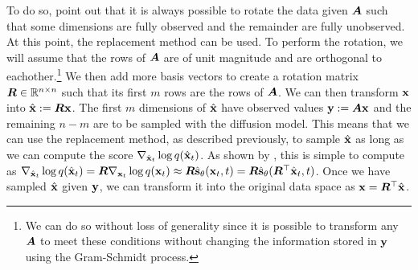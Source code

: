 To do so, \citet{song2020score} point out that it is always possible to rotate the data given ${\bm{A}}$ such that some dimensions are fully observed and the remainder are fully unobserved. At this point, the replacement method can be used. To perform the rotation, we will assume that the rows of ${\bm{A}}$ are of unit magnitude and are orthogonal to eachother.\footnote{We can do so without loss of generality since it is possible to transform any ${\bm{A}}$ to meet these conditions without changing the information stored in ${\mathbf{y}}$ using the Gram-Schmidt process.} We then add more basis vectors to create a rotation matrix ${\bm{R}} \in \mathbb{R}^{n \times n}$ such that its first $m$ rows are the rows of ${\bm{A}}$. We can then transform ${\mathbf{x}}$ into $\hat{{\mathbf{x}}} := {\bm{R}} {\mathbf{x}}$. The first $m$ dimensions of $\hat{{\mathbf{x}}}$ have observed values ${\mathbf{y}} := {\bm{A}}{\mathbf{x}}$ and the remaining $n-m$ are to be sampled with the diffusion model. This means that we can use the replacement method, as described previously, to sample $\hat{{\mathbf{x}}}$ as long as we can compute the score $\nabla_{\hat{{\mathbf{x}}}_t} \log q(\hat{{\mathbf{x}}}_t)$. As shown by \citet{song2020score}, this is simple to compute as $\nabla_{\hat{{\mathbf{x}}}_t} \log q(\hat{{\mathbf{x}}}_t) = {\bm{R}} \nabla_{{\mathbf{x}}_t} \log q({\mathbf{x}}_t) \approx {\bm{R}} \hat{{\mathbf{s}}}_\theta({\mathbf{x}}_t, t) = {\bm{R}} \hat{{\mathbf{s}}}_\theta({\bm{R}}^\top \hat{{\mathbf{x}}}_t, t)$. Once we have sampled $\hat{{\mathbf{x}}}$ given ${\mathbf{y}}$, we can transform it into the original data space as ${\mathbf{x}} = {\bm{R}}^\top \hat{{\mathbf{x}}}$.

